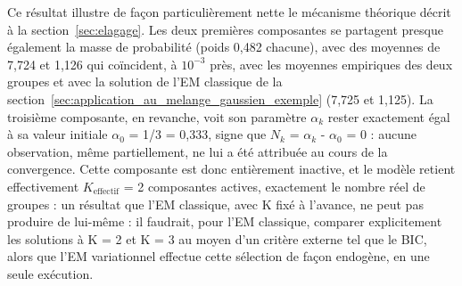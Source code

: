 Ce résultat illustre de façon particulièrement nette le mécanisme théorique décrit à la section~\ref{sec:elagage}. Les deux premières composantes se partagent presque également la masse de probabilité (poids 0,482 chacune), avec des moyennes de 7,724 et 1,126 qui coïncident, à $10^{-3}$ près, avec les moyennes empiriques des deux groupes et avec la solution de l'EM classique de la section~\ref{sec:application_au_melange_gaussien_exemple} (7,725 et 1,125). La troisième composante, en revanche, voit son paramètre $\alpha _{k}$ rester exactement égal à sa valeur initiale $\alpha _{0}$ = 1/3 = 0,333, signe que $N_{k}$ = $\alpha _{k}$ - $\alpha _{0}$ = 0 : aucune observation, même partiellement, ne lui a été attribuée au cours de la convergence. Cette composante est donc entièrement inactive, et le modèle retient effectivement $K_{\text{effectif}}$ = 2 composantes actives, exactement le nombre réel de groupes : un résultat que l'EM classique, avec K fixé à l'avance, ne peut pas produire de lui-même : il faudrait, pour l'EM classique, comparer explicitement les solutions à K = 2 et K = 3 au moyen d'un critère externe tel que le BIC, alors que l'EM variationnel effectue cette sélection de façon endogène, en une seule exécution.

